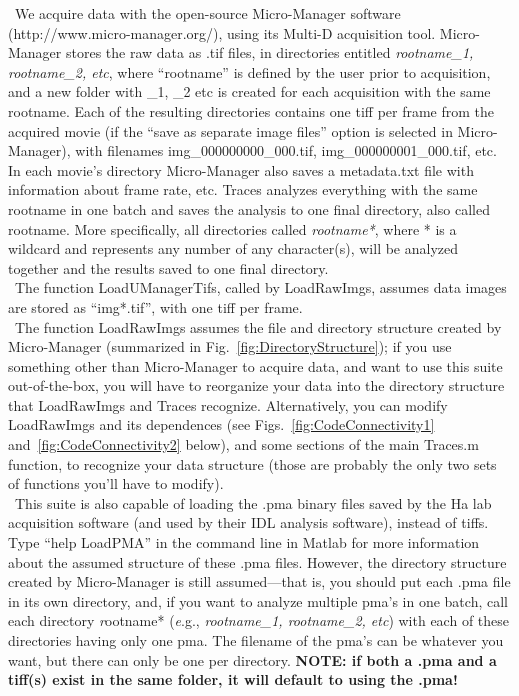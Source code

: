 \documentclass[11pt]{article}
\begin{document}
\noindent \textbullet~We acquire data with the open-source Micro-Manager software (http://www.micro-manager.org/), using its Multi-D acquisition tool. Micro-Manager stores the raw data as .tif files, in directories entitled \textit{rootname\_1, rootname\_2, etc}, where ``rootname'' is defined by the user prior to acquisition, and a new folder with \_1, \_2 etc is created for each acquisition with the same rootname.  Each of the resulting directories contains one tiff per frame from the acquired movie (if the ``save as separate image files'' option is selected in Micro-Manager), with filenames img\_000000000\_000.tif, img\_000000001\_000.tif, etc. In each movie's directory Micro-Manager also saves a metadata.txt file with information about frame rate, etc.  Traces analyzes everything with the same rootname in one batch and saves the analysis to one final directory, also called rootname.  More specifically, all directories called \textit{rootname*}, where * is a wildcard and represents any number of any character(s), will be analyzed together and the results saved to one final directory. \\

\noindent \textbullet~The function LoadUManagerTifs, called by LoadRawImgs, assumes data images are stored as ``img*.tif'', with one tiff per frame.\\

\noindent \textbullet~The function LoadRawImgs assumes the file and directory structure created by Micro-Manager (summarized in Fig.~\ref{fig:DirectoryStructure}); if you use something other than Micro-Manager to acquire data, and want to use this suite out-of-the-box, you will have to reorganize your data into the directory structure that LoadRawImgs and Traces recognize.  Alternatively, you can modify LoadRawImgs and its dependences (see Figs.~\ref{fig:CodeConnectivity1} and~\ref{fig:CodeConnectivity2} below), and some sections of the main Traces.m function, to recognize your data structure (those are probably the only two sets of functions you'll have to modify).  \\

\noindent \textbullet~This suite is also capable of loading the .pma binary files saved by the Ha lab acquisition software (and used by their IDL analysis software), instead of tiffs.  Type ``help LoadPMA'' in the command line in Matlab for more information about the assumed structure of these .pma files.  However, the directory structure created by Micro-Manager is still assumed---that is, you should put each .pma file in its own directory, and, if you want to analyze multiple pma's in one batch, call each directory {\textit rootname*} ({\textit e.g.}, \textit{rootname\_1, rootname\_2, etc}) with each of these directories having only one pma.  The filename of the pma's can be whatever you want, but there can only be one per directory. {\bf NOTE: if both a .pma and a tiff(s) exist in the same folder, it will default to using the .pma!} \\
\end{document}
